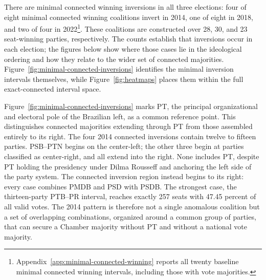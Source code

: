 \documentclass[11pt]{article}
\begin{document}
There are minimal connected winning inversions in all three elections:
four of eight minimal connected winning coalitions invert in 2014, one
of eight in 2018, and two of four in 2022\footnote{
Appendix~\ref{app:minimal-connected-winning} reports all twenty
baseline minimal connected winning intervals, including those
with vote majorities.}. These coalitions are
constructed over 28, 30, and 23 seat-winning parties, respectively.
The counts establish that inversions occur in each election; the figures
below show where those cases lie in the ideological ordering and how
they relate to the wider set of connected majorities. Figure~\ref{fig:minimal-connected-inversions}
identifies the minimal inversion intervals themselves, while
Figure~\ref{fig:heatmaps} places them within the full exact-connected
interval space.

Figure~\ref{fig:minimal-connected-inversions} marks PT, the principal organizational and electoral pole of the
Brazilian left, as a common reference point. This distinguishes connected
majorities extending through PT from those assembled entirely to its right. The
four 2014 connected inversions contain twelve to fifteen parties. PSB--PTN
begins on the center-left; the other three begin at parties classified as
center-right, and all extend into the right. None includes PT, despite PT
holding the presidency under Dilma Rousseff and anchoring the left side of the
party system. The connected inversion region instead begins to its right: every
case combines PMDB and PSD with PSDB. The strongest case, the thirteen-party
PTB--PR interval, reaches exactly 257 seats with 47.45 percent of all valid
votes. The 2014 pattern is therefore not a single anomalous coalition but a set
of overlapping combinations, organized around a common group of parties, that
can secure a Chamber majority without PT and without a national vote majority.
\end{document}
